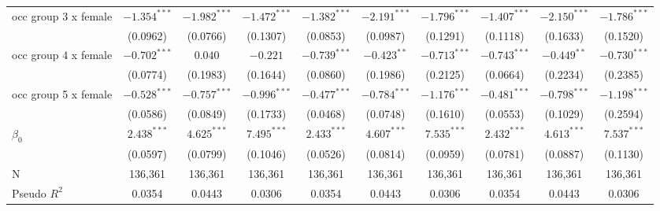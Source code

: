 \begin{tabular}{l|ccc|ccc|ccc|}
occ group 3 x female       &          $-1.354^{***}$ &  $-1.982^{***}$ &  $-1.472^{***}$ &           $-1.382^{***}$ &  $-2.191^{***}$ &  $-1.796^{***}$ &           $-1.407^{***}$ &  $-2.150^{***}$ &  $-1.786^{***}$ \\
                           &                (0.0962) &        (0.0766) &        (0.1307) &                 (0.0853) &        (0.0987) &        (0.1291) &                 (0.1118) &        (0.1633) &        (0.1520) \\
occ group 4 x female       &          $-0.702^{***}$ &         $0.040$ &        $-0.221$ &           $-0.739^{***}$ &   $-0.423^{**}$ &  $-0.713^{***}$ &           $-0.743^{***}$ &   $-0.449^{**}$ &  $-0.730^{***}$ \\
                           &                (0.0774) &        (0.1983) &        (0.1644) &                 (0.0860) &        (0.1986) &        (0.2125) &                 (0.0664) &        (0.2234) &        (0.2385) \\
occ group 5 x female       &          $-0.528^{***}$ &  $-0.757^{***}$ &  $-0.996^{***}$ &           $-0.477^{***}$ &  $-0.784^{***}$ &  $-1.176^{***}$ &           $-0.481^{***}$ &  $-0.798^{***}$ &  $-1.198^{***}$ \\
                           &                (0.0586) &        (0.0849) &        (0.1733) &                 (0.0468) &        (0.0748) &        (0.1610) &                 (0.0553) &        (0.1029) &        (0.2594) \\
$\beta_0$                  &           $2.438^{***}$ &   $4.625^{***}$ &   $7.495^{***}$ &            $2.433^{***}$ &   $4.607^{***}$ &   $7.535^{***}$ &            $2.432^{***}$ &   $4.613^{***}$ &   $7.537^{***}$ \\
                           &                (0.0597) &        (0.0799) &        (0.1046) &                 (0.0526) &        (0.0814) &        (0.0959) &                 (0.0781) &        (0.0887) &        (0.1130) \\
N                          &                 136,361 &         136,361 &         136,361 &                  136,361 &         136,361 &         136,361 &                  136,361 &         136,361 &         136,361 \\
Pseudo $R^2$               &                  0.0354 &          0.0443 &          0.0306 &                   0.0354 &          0.0443 &          0.0306 &                   0.0354 &          0.0443 &          0.0306 \\
\bottomrule
\end{tabular}
